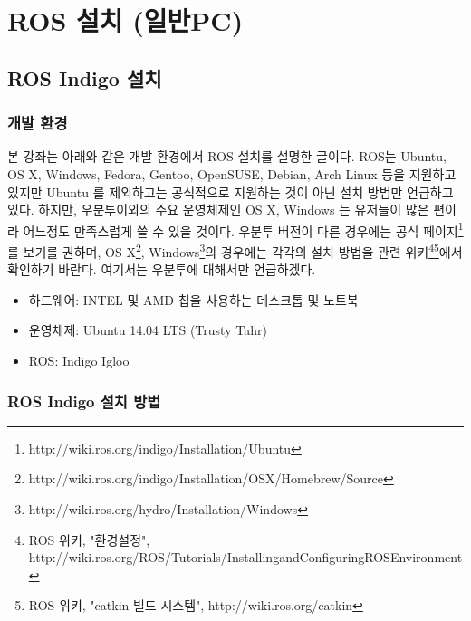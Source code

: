 
\chapter{ROS 설치 (일반PC)}

\section{ROS Indigo 설치}

\subsection{개발 환경}

본 강좌는 아래와 같은 개발 환경에서 ROS 설치를 설명한 글이다. ROS는 Ubuntu, OS X, Windows, Fedora, Gentoo, OpenSUSE, Debian, Arch Linux 등을 지원하고 있지만 Ubuntu 를 제외하고는 공식적으로 지원하는 것이 아닌 설치 방법만 언급하고 있다. 하지만, 우분투이외의 주요 운영체제인 OS X, Windows 는 유저들이 많은 편이라 어느정도 만족스럽게 쓸 수 있을 것이다. 우분투 버전이 다른 경우에는 공식 페이지\footnote{http://wiki.ros.org/indigo/Installation/Ubuntu}를 보기를 권하며, OS X\footnote{http://wiki.ros.org/indigo/Installation/OSX/Homebrew/Source}, Windows\footnote{http://wiki.ros.org/hydro/Installation/Windows}의 경우에는 각각의 설치 방법을 관련 위키\footnote{ROS 위키, "환경설정", http://wiki.ros.org/ROS/Tutorials/InstallingandConfiguringROSEnvironment}\footnote{ROS 위키, "catkin 빌드 시스템", http://wiki.ros.org/catkin}에서 확인하기 바란다. 여기서는 우분투에 대해서만 언급하겠다.

\begin{itemize}
\item 하드웨어: INTEL 및 AMD 칩을 사용하는 데스크톱 및 노트북 
\item 운영체제: Ubuntu 14.04 LTS (Trusty Tahr)
\item ROS: Indigo Igloo
\end{itemize}

\subsection{ROS Indigo 설치 방법}
\label{sec:ROSInstallation}

